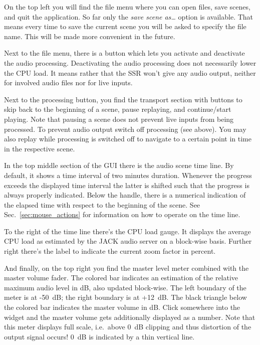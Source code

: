 On the top left you will find the file menu where you can open files, save
scenes, and quit the application. So far only the \emph{save scene as\dots}
option is available. That means every time to save the current scene you will
be asked to specify the file name. This will be made more convenient in the
future.

Next to the file menu, there is a button which lets you activate and deactivate
the audio processing. Deactivating the audio processing does not necessarily
lower the CPU load. It means rather that the SSR won't give any audio output,
neither for involved audio files nor for live inputs.

Next to the processing button, you find the transport section with buttons to
skip back to the beginning of a scene, pause replaying, and continue/start
playing. Note that pausing a scene does not prevent live inputs from being
processed. To prevent audio output switch off processing (see above). You may
also replay while processing is switched off to navigate to a certain point in
time in the respective scene.

In the top middle section of the GUI there is the audio scene time line.
By default, it shows a time interval of two minutes duration. Whenever
the progress exceeds the displayed time interval the latter is shifted
such that the progress is always properly indicated.
Below the handle, there is a numerical
indication of the elapsed time with respect to the beginning of the scene.
See Sec.~\ref{sec:mouse_actions}
for information on how to operate on the time line.

To the right of the time line there's the CPU load gauge. It
displays the average CPU load as estimated by the JACK audio
server on a block-wise basis.
Further right there's the label to indicate the current zoom factor
in percent.

And finally, on the top right you find the master level meter combined with the
master volume fader. The colored bar indicates an estimation of the relative
maximum audio level in dB, also updated block-wise. The left boundary of the
meter is at -50~dB; the right boundary is at +12~dB. The black triangle below
the colored bar indicates the master volume in dB. Click somewhere into the
widget and the master volume gets additionally displayed as a number. Note that
this meter displays full scale, i.e.~above 0~dB clipping and thus distortion of
the output signal occurs! 0~dB is indicated by a thin vertical line.

